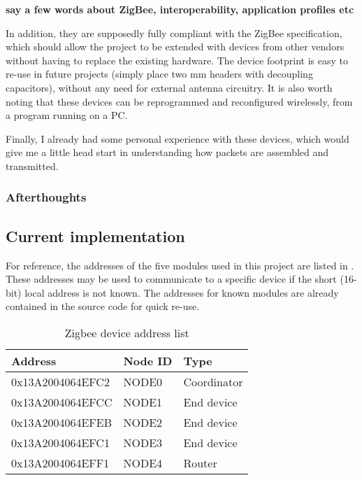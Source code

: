 \textbf{say a few words about ZigBee, interoperability, application profiles
etc}

In addition, they are supposedly fully compliant with the
ZigBee specification, which should allow the project to
be extended with devices from other vendors without having to replace the
existing hardware. The device footprint is easy to re-use in future projects
(simply place two \unit[2]{mm} headers with decoupling capacitors), without any
need for external antenna circuitry. It is also worth noting that these devices
can be reprogrammed and reconfigured wirelessly, from a program running on a PC.

Finally, I already had some personal experience with these devices, which would
give me a little head start in understanding how packets are assembled and
transmitted.

\subsubsection{Afterthoughts}

\subsection{Current implementation}
For reference, the addresses of the five modules used in this project are listed
in . These addresses may be used to communicate to a specific
device if the short (16-bit) local address is not known. The addresses for known
modules are already contained in the source code for quick re-use.

\begin{table}[h]
  \centering
  \begin{tabular}{l|l|l}
    Address & Node ID & Type \\
    \hline
    0x13A2004064EFC2 & NODE0 & Coordinator \\
    0x13A2004064EFCC & NODE1 & End device \\
    0x13A2004064EFEB & NODE2 & End device \\
    0x13A2004064EFC1 & NODE3 & End device \\
    0x13A2004064EFF1 & NODE4 & Router \\
  \end{tabular}
  \caption{Zigbee device address list}
  \label{tab:addresses}
\end{table}


